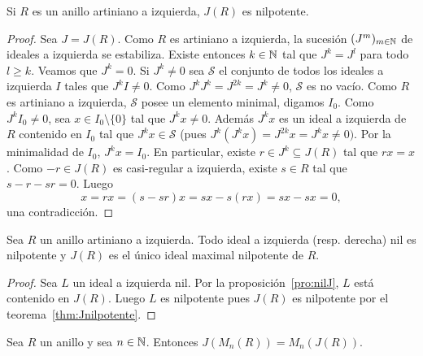 \begin{theorem}
	\label{thm:Jnilpotente}
	Si $R$ es un anillo artiniano a izquierda, $J(R)$ es nilpotente. 
\end{theorem}

\begin{proof}
	Sea $J=J(R)$. Como $R$ es artiniano a izquierda, la sucesión
	$(J^m)_{m\in\mathbb{N}}$ de ideales a izquierda se estabiliza. Existe entonces
	$k\in\mathbb{N}$ tal que $J^k=J^l$ para todo $l\geq k$. Veamos que $J^k=0$. Si
	$J^k\ne0$ sea $\mathcal{S}$ el conjunto de todos los ideales a izquierda
	$I$ tales que $J^kI\ne0$. Como $J^kJ^k=J^{2k}=J^k\ne 0$, $\mathcal{S}$ es
	no vacío. Como $R$ es artiniano a izquierda, $\mathcal{S}$ posee un
	elemento minimal, digamos $I_0$. Como $J^kI_0\ne 0$, sea $x\in
	I_0\setminus\{0\}$ tal que $J^kx\ne 0$. Además $J^kx$ es un ideal a
	izquierda de $R$ contenido en $I_0$ tal que $J^kx\in\mathcal{S}$ (pues
	$J^k(J^kx)=J^{2k}x=J^kx\ne 0)$. Por la minimalidad de $I_0$, $J^kx=I_0$. En
	particular, existe $r\in J^k\subseteq J(R)$ tal que $rx=x$. Como $-r\in
	J(R)$ es casi-regular a izquierda, existe $s\in R$ tal que $s-r-sr=0$.
	Luego
	\[
		x=rx=(s-sr)x=sx-s(rx)=sx-sx=0,
	\]
	una contradicción.
\end{proof}

\begin{corollary}
	Sea $R$ un anillo artiniano a izquierda.  Todo ideal a izquierda (resp.
	derecha) nil es nilpotente y $J(R)$ es el único ideal maximal nilpotente de
	$R$.
\end{corollary}

\begin{proof}
	Sea $L$ un ideal a izquierda nil.  Por la proposición~\ref{pro:nilJ}, $L$
	está contenido en $J(R)$. Luego $L$ es nilpotente pues $J(R)$ es nilpotente
	por el teorema~\ref{thm:Jnilpotente}. 
\end{proof}

\begin{theorem}
	Sea $R$ un anillo y sea $n\in\mathbb{N}$. Entonces $J(M_n(R))=M_n(J(R))$. 
\end{theorem}

